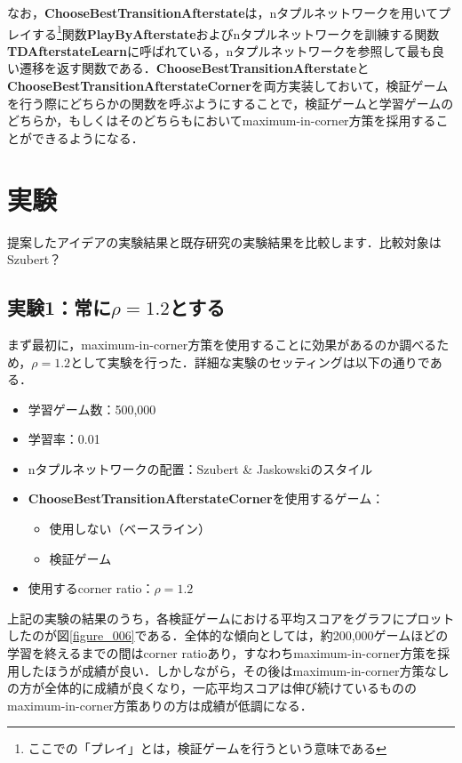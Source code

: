 \documentclass{suribt}
\begin{document}
なお，\textbf{ChooseBestTransitionAfterstate}は，nタプルネットワークを用いてプレイする\footnote{ここでの「プレイ」とは，検証ゲームを行うという意味である}関数\textbf{PlayByAfterstate}およびnタプルネットワークを訓練する関数\textbf{TDAfterstateLearn}に呼ばれている，nタプルネットワークを参照して最も良い遷移を返す関数である．\textbf{ChooseBestTransitionAfterstate}と\textbf{ChooseBestTransitionAfterstateCorner}を両方実装しておいて，検証ゲームを行う際にどちらかの関数を呼ぶようにすることで，検証ゲームと学習ゲームのどちらか，もしくはそのどちらもにおいてmaximum-in-corner方策を採用することができるようになる．

\chapter{実験}
提案したアイデアの実験結果と既存研究の実験結果を比較します．比較対象はSzubert？

\section{実験1：常に${\rho}=1.2$とする}
まず最初に，maximum-in-corner方策を使用することに効果があるのか調べるため，${\rho}=1.2$として実験を行った．詳細な実験のセッティングは以下の通りである．

\begin{itemize}
\item 学習ゲーム数：500,000
\item 学習率：0.01
\item nタプルネットワークの配置：Szubert \& Jaskowskiのスタイル
\item \textbf{ChooseBestTransitionAfterstateCorner}を使用するゲーム：
\begin{itemize}
\item 使用しない（ベースライン）
\item 検証ゲーム
\end{itemize}
\item 使用するcorner ratio：${\rho}=1.2$
\end{itemize}

上記の実験の結果のうち，各検証ゲームにおける平均スコアをグラフにプロットしたのが図\ref{figure_006}である．全体的な傾向としては，約200,000ゲームほどの学習を終えるまでの間はcorner ratioあり，すなわちmaximum-in-corner方策を採用したほうが成績が良い．しかしながら，その後はmaximum-in-corner方策なしの方が全体的に成績が良くなり，一応平均スコアは伸び続けているもののmaximum-in-corner方策ありの方は成績が低調になる．
\end{document}
